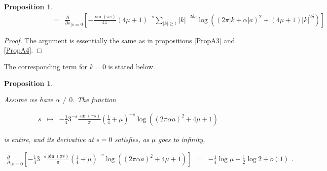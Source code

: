 \documentclass{jams-l}
\newtheorem{proposition}[theorem]{Proposition}
\theoremstyle{definition}
\theoremstyle{remark}
\numberwithin{equation}{section}
\begin{document}
\begin{proposition}
\[\begin{array}{lll}
                        \qquad \qquad \qquad & \scriptstyle = & \scriptstyle \frac{\partial}{\partial s}_{\left \vert s = 0 \right.}  \left[ - \frac{\sin \left(\pi s \right)}{4 \pi} \left( 4 \mu + 1 \right)^{-s} \sum\limits_{\left \vert k \right \vert \geqslant 1} \left \vert k \right \vert^{-2 \delta s} \log \left( \left( 2 \pi \left \vert k + \alpha \right \vert a \right)^2 + \left( 4 \mu + 1 \right) \left \vert k \right \vert^{2 \delta} \right) \right]
                    \end{array} \]
            
            \end{proposition}
            
            \begin{proof}
            
                The argument is essentially the same as in propositions \ref{PropA3} and \ref{PropA4}.
            
            \end{proof}
            
            The corresponding term for $k = 0$ is stated below.
            
            \begin{proposition}
            \label{PropA5-0}
            
                Assume we have $\alpha \neq 0$. The function
                
                \[ \begin{array}{lll}
                        s & \longmapsto & - \frac{1}{4} 3^{-s} \frac{\sin \left( \pi s \right)}{\pi} \left( \frac{1}{4} + \mu \right)^{-s} \log \left( \left( 2 \pi \alpha a \right)^2 + 4 \mu + 1 \right)
                    \end{array} \]
                
                \noindent is entire, and its derivative at $s=0$ satisfies, as $\mu$ goes to infinity,
                
                \[ \begin{array}{lll}
                        \scriptstyle \frac{\partial}{\partial}_{\left \vert s = 0 \right.} \left[ - \frac{1}{4} 3^{-s} \frac{\sin \left( \pi s \right)}{\pi} \left( \frac{1}{4} + \mu \right)^{-s} \log \left( \left( 2 \pi \alpha a \right)^2 + 4 \mu + 1 \right) \right] & \scriptstyle = & \scriptstyle - \frac{1}{4} \log \mu - \frac{1}{2} \log 2 + o \left( 1 \right)
                    \end{array} . \]
            
            \end{proposition}
            
\end{document}
